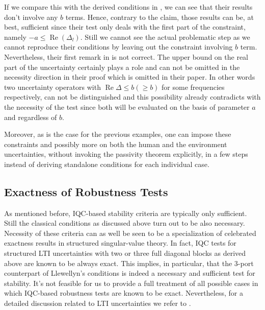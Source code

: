If we compare this with the derived conditions in \cite{jazayeri}, we can see that their results don't involve any $b$ terms. Hence, 
contrary to the claim, those results can be, at best, sufficient since their test only deals with the first part of the constraint, namely 
$-a\leq \operatorname{Re}({\Delta_l})$. Still we cannot see the actual problematic step as we cannot reproduce their conditions by leaving out 
the constraint involving $b$ term. Nevertheless, their first remark in \cite[Theorem 3]{jazayeri} is not correct. The upper bound 
on the real part of the uncertainty certainly plays a role and can not be omitted in the necessity direction in their proof which is omitted 
in their paper. In other words two uncertainty operators with $\operatorname{Re}{\Delta}\leq b (\geq b)$ for some frequencies respectively,
can not be distinguished and this possibility already contradicts with the necessity of the test since both will be evaluated on the 
basis of parameter $a$ and regardless of $b$. 

Moreover, as is the case for the previous examples, one can impose these constraints and possibly more on both the human and the environment 
uncertainties, without invoking the passivity theorem explicitly, in a few steps instead of deriving standalone conditions for each individual case.

\subsection{Exactness of Robustness Tests}\label{sec:exact}
As mentioned before, IQC-based stability criteria are typically only sufficient.
Still the classical conditions as discussed above %
turn out to be also necessary. Necessity of these criteria can as well be seen to be a specialization of
celebrated exactness results in structured singular-value theory. In fact, IQC tests
for structured LTI uncertainties with two or three full diagonal blocks as derived above are known to be always exact.
This implies, in particular, that the 3-port counterpart of Llewellyn's conditions is indeed
a necessary and sufficient test for stability. It's not feasible for us to provide a full treatment of all possible 
cases in which IQC-based robustness tests are known to be exact. Nevertheless, for a detailed discussion related to LTI 
uncertainties we refer to \cite{packdoyle,fantits,cwssimax}.

